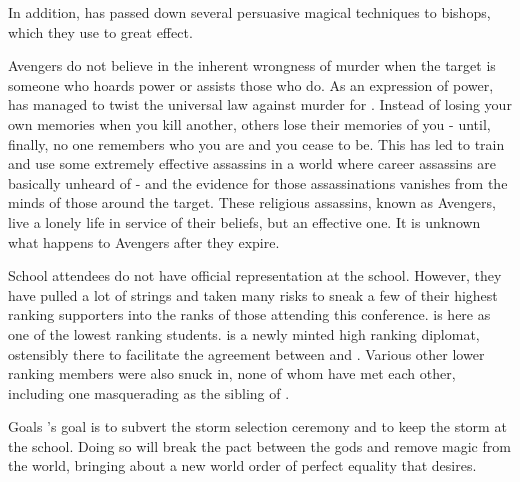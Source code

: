 \documentclass[blue]{GL2020}
\begin{document}
In addition, \cCultLeader has passed down several persuasive magical techniques to bishops, which they use to great effect.

Avengers
\pCult do not believe in the inherent wrongness of murder when the target is someone who hoards power or assists those who do. As an expression of power, \cCultGod has managed to twist the universal law against murder for \pCult. Instead of losing your own memories when you kill another, others lose their memories of you - until, finally, no one remembers who you are and you cease to be. This has led \pCult to train and use some extremely effective assassins in a world where career assassins are basically unheard of - and the evidence for those assassinations vanishes from the minds of those around the target. These religious assassins, known as Avengers, live a lonely life in service of their beliefs, but an effective one. It is unknown what happens to Avengers after they expire.



School attendees
\pCult do not have official representation at the school. However, they have pulled a lot of strings and taken many risks to sneak a few of their highest ranking supporters into the ranks of those attending this conference. \cCultLeader is here as one of the lowest ranking students. \cTechBishop is a newly minted high ranking diplomat, ostensibly there to facilitate the agreement between \pTech and \pFarm. Various other lower ranking members were also snuck in, none of whom have met each other, including one masquerading as the sibling of \cAmnesiac{}.


Goals
\pCult's goal is to subvert the storm selection ceremony and to keep the storm at the school. Doing so will break the pact between the gods and remove magic from the world, bringing about a new world order of perfect equality that \cCultLeader desires.
\end{document}
